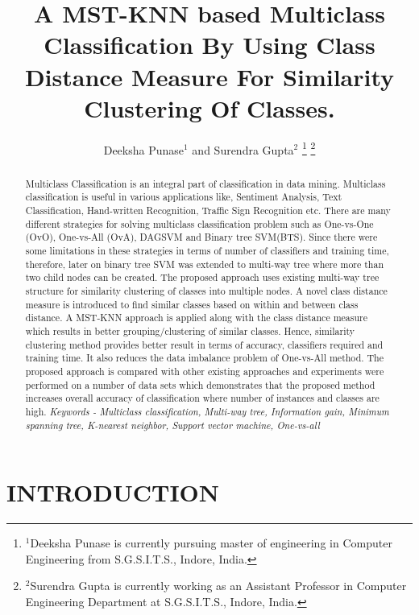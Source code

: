 \documentclass[a4paper, 10pt, conference]{ieeeconf}      %
\title{\LARGE \bf
A MST-KNN based Multiclass Classification By Using Class Distance Measure For Similarity Clustering Of Classes.}
\author{Deeksha Punase$^{1}$ and Surendra Gupta$^{2}$%
\thanks{$^{1}$Deeksha Punase is currently pursuing master of engineering in Computer Engineering from S.G.S.I.T.S., Indore, India.}%
\thanks{$^{2}$Surendra Gupta is currently working as an Assistant Professor in Computer Engineering Department at S.G.S.I.T.S., Indore, India.}%
}
\begin{document}
\maketitle
\thispagestyle{empty}
\pagestyle{empty}


\begin{abstract}
Multiclass Classification is an integral part of classification in data mining. Multiclass classification is useful in various applications like, Sentiment Analysis, Text Classification, Hand-written Recognition, Traffic Sign Recognition etc. There are many different strategies for solving multiclass classification problem such as One-vs-One (OvO), One-vs-All (OvA), DAGSVM and  Binary tree SVM(BTS). Since there were some limitations in these strategies in terms of number of classifiers and training time, therefore, later on binary tree SVM was extended to multi-way tree where more than two child nodes can be created. The proposed approach uses existing multi-way tree structure for similarity clustering of classes into multiple nodes. A novel class distance measure is introduced to find similar classes based on within and between class distance. A MST-KNN approach is applied along with the class distance measure which results in better grouping/clustering of similar classes. Hence, similarity clustering method provides better result in terms of accuracy, classifiers required and training time. It also reduces the data imbalance problem of One-vs-All method. The proposed approach is compared with other existing approaches and experiments were performed on a number of data sets which demonstrates that the proposed method increases overall accuracy of classification where number of instances and classes are high.
\vspace{0.2cm}\newline
\textit{Keywords - Multiclass classification, Multi-way tree, Information gain, Minimum spanning tree, K-nearest neighbor, Support vector machine, One-vs-all}  
\end{abstract}


\section{INTRODUCTION}
\end{document}
